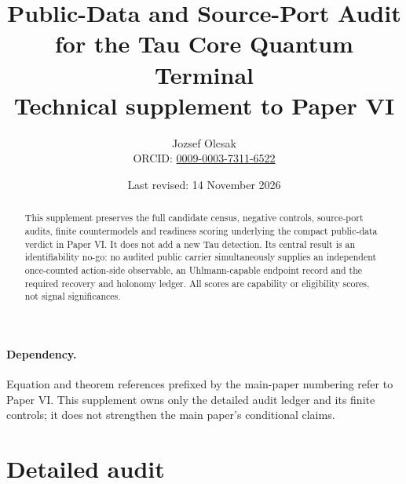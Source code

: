 \documentclass[11pt]{article}
\title{\textbf{Public-Data and Source-Port Audit for the Tau Core Quantum Terminal}\\
\large Technical supplement to Paper VI}
\author{Jozsef Olcsak\\{\small ORCID: \href{https://orcid.org/0009-0003-7311-6522}{0009-0003-7311-6522}}}
\date{Last revised: 14 November 2026}
\begin{document}
\maketitle

\begin{abstract}
This supplement preserves the full candidate census, negative controls,
source-port audits, finite countermodels and readiness scoring underlying the
compact public-data verdict in Paper VI.  It does not add a new Tau detection.
Its central result is an identifiability no-go: no audited public carrier
simultaneously supplies an independent once-counted action-side observable,
an Uhlmann-capable endpoint record and the required recovery and holonomy
ledger.  All scores are capability or eligibility scores, not signal
significances.
\end{abstract}

\paragraph{Dependency.}
Equation and theorem references prefixed by the main-paper numbering refer to
Paper VI.  This supplement owns only the detailed audit ledger and its finite
controls; it does not strengthen the main paper's conditional claims.

\section{Detailed audit}




\end{document}
